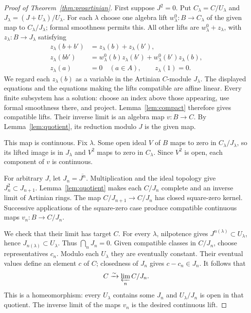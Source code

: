\documentclass[11pt]{article}
\theoremstyle{definition}\newtheorem{definition}[theorem]{Definition}
\theoremstyle{remark}\newtheorem{remark}[theorem]{Remark}
\begin{document}
\begin{proof}[Proof of Theorem~\ref{thm:proartinian}]
First suppose $J^2=0$. Put $C_\lambda=C/U_\lambda$ and $J_\lambda=(J+U_\lambda)/U_\lambda$. For each $\lambda$ choose one algebra lift $w^0_\lambda:B\to C_\lambda$ of the given map to $C_\lambda/J_\lambda$; formal smoothness permits this. All other lifts are $w^0_\lambda+z_\lambda$, with $z_\lambda:B\to J_\lambda$ satisfying
\[
\begin{aligned}
 z_\lambda(b+b')&=z_\lambda(b)+z_\lambda(b'),\\
 z_\lambda(bb')&=w^0_\lambda(b)z_\lambda(b')+w^0_\lambda(b')z_\lambda(b),\\
 z_\lambda(a)&=0\quad(a\in A),\qquad z_\lambda(1)=0.
\end{aligned}
\]
We regard each $z_\lambda(b)$ as a variable in the Artinian $C$-module $J_\lambda$. The displayed equations and the equations making the lifts compatible are affine linear. Every finite subsystem has a solution: choose an index above those appearing, use formal smoothness there, and project. Lemma~\ref{lem:compact} therefore gives compatible lifts. Their inverse limit is an algebra map $v:B\to C$. By Lemma~\ref{lem:quotient}, its reduction modulo $J$ is the given map.

This map is continuous. Fix $\lambda$. Some open ideal $V$ of $B$ maps to zero in $C_\lambda/J_\lambda$, so its lifted image is in $J_\lambda$ and $V^2$ maps to zero in $C_\lambda$. Since $V^2$ is open, each component of $v$ is continuous.

For arbitrary $J$, let $J_n=\overline{J^n}$. Multiplication and the ideal topology give $J_n^2\subset J_{n+1}$. Lemma~\ref{lem:quotient} makes each $C/J_n$ complete and an inverse limit of Artinian rings. The map $C/J_{n+1}\to C/J_n$ has closed square-zero kernel. Successive applications of the square-zero case produce compatible continuous maps $v_n:B\to C/J_n$.

We check that their limit has target $C$. For every $\lambda$, nilpotence gives $J^{n(\lambda)}\subset U_\lambda$, hence $J_{n(\lambda)}\subset U_\lambda$. Thus $\bigcap_nJ_n=0$. Given compatible classes in $C/J_n$, choose representatives $c_n$. Modulo each $U_\lambda$ they are eventually constant. Their eventual values define an element $c$ of $C$; closedness of $J_n$ gives $c-c_n\in J_n$. It follows that
\[
 C\xrightarrow{\sim}\varprojlim_n C/J_n.
\]
This is a homeomorphism: every $U_\lambda$ contains some $J_n$ and $U_\lambda/J_n$ is open in that quotient. The inverse limit of the maps $v_n$ is the desired continuous lift.
\end{proof}
\end{document}
